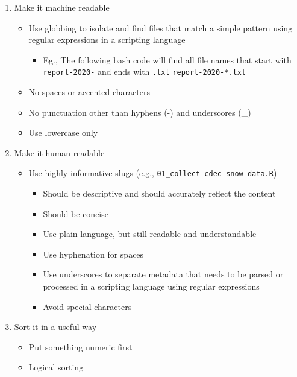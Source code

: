 \documentclass[
  letterpaper,
  DIV=11,
  numbers=noendperiod]{scrreprt}
\providecommand{\tightlist}{%
  \setlength{\itemsep}{0pt}\setlength{\parskip}{0pt}}\usepackage{longtable,booktabs,array}
\begin{document}
\begin{enumerate}
\def\labelenumi{\arabic{enumi}.}
\tightlist
\item
  Make it machine readable

  \begin{itemize}
  \tightlist
  \item
    Use globbing to isolate and find files that match a simple pattern
    using regular expressions in a scripting language

    \begin{itemize}
    \tightlist
    \item
      Eg., The following bash code will find all file names that start
      with \texttt{report-2020-} and ends with \texttt{.txt}
      \texttt{report-2020-*.txt}
    \end{itemize}
  \item
    No spaces or accented characters
  \item
    No punctuation other than hyphens (-) and underscores (\_)
  \item
    Use lowercase only
  \end{itemize}
\item
  Make it human readable

  \begin{itemize}
  \tightlist
  \item
    Use highly informative slugs (e.g.,
    \texttt{01\_collect-cdec-snow-data.R})

    \begin{itemize}
    \tightlist
    \item
      Should be descriptive and should accurately reflect the content
    \item
      Should be concise
    \item
      Use plain language, but still readable and understandable
    \item
      Use hyphenation for spaces
    \item
      Use underscores to separate metadata that needs to be parsed or
      processed in a scripting language using regular expressions
    \item
      Avoid special characters
    \end{itemize}
  \end{itemize}
\item
  Sort it in a useful way

  \begin{itemize}
  \tightlist
  \item
    Put something numeric first
  \item
    Logical sorting


\end{itemize}
\end{enumerate}
\end{document}

